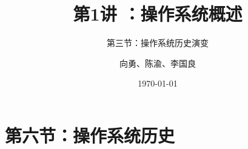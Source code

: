 


\title[第1讲]{第1讲 ：操作系统概述} %
\subtitle{第三节：操作系统历史演变}
\author{向勇、陈渝、李国良} %
\date{\today} %



\begin{frame}
\titlepage %
\end{frame}



\section{第六节：操作系统历史} %

